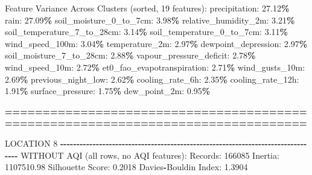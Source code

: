 \documentclass[
  letterpaper,
  DIV=11,
  numbers=noendperiod]{scrartcl}
\newenvironment{Shaded}{\begin{snugshade}}{\end{snugshade}}
\newcommand{\BuiltInTok}[1]{#1}
\newcommand{\DecValTok}[1]{\textcolor[rgb]{0.00,0.00,0.81}{#1}}
\newcommand{\FloatTok}[1]{\textcolor[rgb]{0.00,0.00,0.81}{#1}}
\newcommand{\NormalTok}[1]{#1}
\newcommand{\OperatorTok}[1]{\textcolor[rgb]{0.81,0.36,0.00}{\textbf{#1}}}
\begin{document}
\begin{Shaded}
\begin{Highlighting}[]
\NormalTok{  Feature Variance Across Clusters (}\BuiltInTok{sorted}\NormalTok{, }\DecValTok{19}\NormalTok{ features):}
\NormalTok{    precipitation: }\FloatTok{27.12}\OperatorTok{\%}
\NormalTok{    rain: }\FloatTok{27.09}\OperatorTok{\%}
\NormalTok{    soil\_moisture\_0\_to\_7cm: }\FloatTok{3.98}\OperatorTok{\%}
\NormalTok{    relative\_humidity\_2m: }\FloatTok{3.21}\OperatorTok{\%}
\NormalTok{    soil\_temperature\_7\_to\_28cm: }\FloatTok{3.14}\OperatorTok{\%}
\NormalTok{    soil\_temperature\_0\_to\_7cm: }\FloatTok{3.11}\OperatorTok{\%}
\NormalTok{    wind\_speed\_100m: }\FloatTok{3.04}\OperatorTok{\%}
\NormalTok{    temperature\_2m: }\FloatTok{2.97}\OperatorTok{\%}
\NormalTok{    dewpoint\_depression: }\FloatTok{2.97}\OperatorTok{\%}
\NormalTok{    soil\_moisture\_7\_to\_28cm: }\FloatTok{2.88}\OperatorTok{\%}
\NormalTok{    vapour\_pressure\_deficit: }\FloatTok{2.78}\OperatorTok{\%}
\NormalTok{    wind\_speed\_10m: }\FloatTok{2.72}\OperatorTok{\%}
\NormalTok{    et0\_fao\_evapotranspiration: }\FloatTok{2.71}\OperatorTok{\%}
\NormalTok{    wind\_gusts\_10m: }\FloatTok{2.69}\OperatorTok{\%}
\NormalTok{    previous\_night\_low: }\FloatTok{2.62}\OperatorTok{\%}
\NormalTok{    cooling\_rate\_6h: }\FloatTok{2.35}\OperatorTok{\%}
\NormalTok{    cooling\_rate\_12h: }\FloatTok{1.91}\OperatorTok{\%}
\NormalTok{    surface\_pressure: }\FloatTok{1.75}\OperatorTok{\%}
\NormalTok{    dew\_point\_2m: }\FloatTok{0.95}\OperatorTok{\%}

\OperatorTok{================================================================================}

\NormalTok{LOCATION }\DecValTok{8}
\OperatorTok{{-}{-}{-}{-}{-}{-}{-}{-}{-}{-}{-}{-}{-}{-}{-}{-}{-}{-}{-}{-}{-}{-}{-}{-}{-}{-}{-}{-}{-}{-}{-}{-}{-}{-}{-}{-}{-}{-}{-}{-}{-}{-}{-}{-}{-}{-}{-}{-}{-}{-}{-}{-}{-}{-}{-}{-}{-}{-}{-}{-}{-}{-}{-}{-}{-}{-}{-}{-}{-}{-}{-}{-}{-}{-}{-}{-}{-}{-}{-}{-}}
\NormalTok{WITHOUT AQI (}\BuiltInTok{all}\NormalTok{ rows, no AQI features):}
\NormalTok{  Records: }\DecValTok{166085}
\NormalTok{  Inertia: }\FloatTok{1107510.98}
\NormalTok{  Silhouette Score: }\FloatTok{0.2018}
\NormalTok{  Davies}\OperatorTok{{-}}\NormalTok{Bouldin Index: }\FloatTok{1.3904}


\end{Highlighting}
\end{Shaded}
\end{document}
